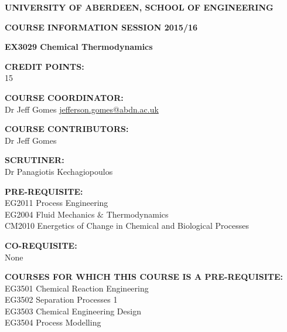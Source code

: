 \documentclass[12pts,a4paper,amsmath,amssymb,floatfix]{article}%
\begin{document}
\begin{center}
{\large {\bf UNIVERSITY OF ABERDEEN, SCHOOL OF ENGINEERING}}
\medskip

{\large {\bf COURSE INFORMATION SESSION 2015/16}}
\bigskip 

{\Large {\bf EX3029 Chemical Thermodynamics}}
\end{center}

\bigskip
\begin{flushleft}

{\large {\bf CREDIT POINTS:}}\\
\hspace{0.8cm}15
\medskip

{\large {\bf COURSE COORDINATOR: }}\\
\hspace{0.8cm}Dr Jeff Gomes \hspace{1.5cm} \href{mailto:jefferson.gomes@abdn.ac.uk}{jefferson.gomes@abdn.ac.uk}
\medskip 

{\large {\bf COURSE CONTRIBUTORS:}}\\
\hspace{0.8cm} Dr Jeff Gomes
\medskip

{\large {\bf SCRUTINER:}}\\
\hspace{0.8cm}Dr Panagiotis Kechagiopoulos
\medskip  

{\large {\bf PRE-REQUISITE:}}\\
\hspace{0.8cm}EG2011 Process Engineering\\
\hspace{0.8cm}EG2004 Fluid Mechanics $\&$ Thermodynamics\\
\hspace{0.8cm}CM2010 Energetics of Change in Chemical and Biological Processes

\medskip

{\large {\bf CO-REQUISITE:}}\\
\hspace{0.8cm}None
\medskip 

{\large {\bf COURSES FOR WHICH THIS COURSE IS A PRE-REQUISITE:}}\\
\hspace{0.8cm}EG3501 Chemical Reaction Engineering\\
\hspace{0.8cm}EG3502 Separation Processes 1\\
\hspace{0.8cm}EG3503 Chemical Engineering Design\\
\hspace{0.8cm}EG3504 Process Modelling\\ 
\end{flushleft}
\end{document}
